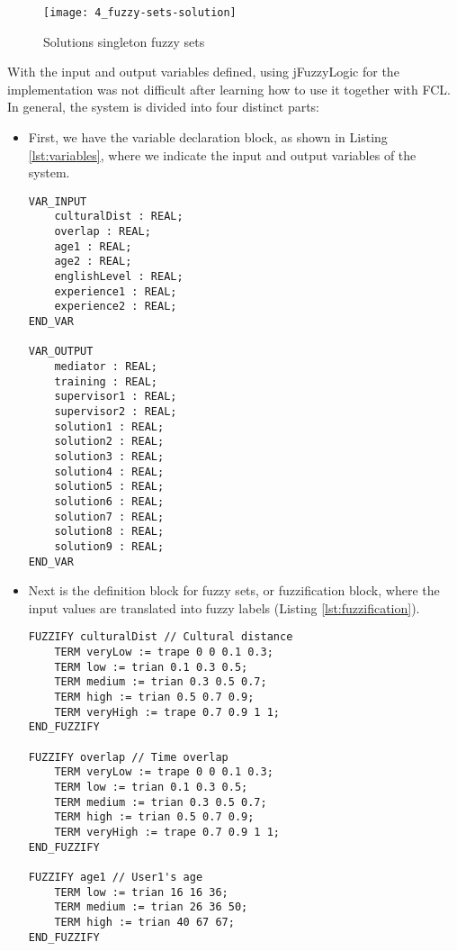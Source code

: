 	\begin{figure}
		\centering
		\texttt{[image: 4\_fuzzy-sets-solution]}
		\caption[Solutions singleton fuzzy sets]{Solutions singleton fuzzy sets}
		\label{fig:fs-solution}
	\end{figure}

With the input and output variables defined, using jFuzzyLogic for the implementation was not difficult after learning how to use it together with FCL. In general, the system is divided into four distinct parts:

\begin{itemize}
\item First, we have the variable declaration block, as shown in Listing \ref{lst:variables}, where we indicate the input and output variables of the system.

\begin{lstlisting}[caption={[Variables declaration]Variables declaration}, label=lst:variables]
VAR_INPUT
	culturalDist : REAL;
	overlap : REAL;
	age1 : REAL;
	age2 : REAL;
	englishLevel : REAL;
	experience1 : REAL;
	experience2 : REAL;
END_VAR

VAR_OUTPUT
	mediator : REAL;
	training : REAL;
	supervisor1 : REAL;
	supervisor2 : REAL;
	solution1 : REAL;
	solution2 : REAL;
	solution3 : REAL;
	solution4 : REAL;
	solution5 : REAL;
	solution6 : REAL;
	solution7 : REAL;
	solution8 : REAL;
	solution9 : REAL;
END_VAR
\end{lstlisting}

\item Next is the definition block for fuzzy sets, or fuzzification block, where the input values are translated into fuzzy labels (Listing \ref{lst:fuzzification}).

\begin{lstlisting}[caption={[Fuzzification block]Fuzzification block}, label=lst:fuzzification]
FUZZIFY culturalDist // Cultural distance
	TERM veryLow := trape 0 0 0.1 0.3;
	TERM low := trian 0.1 0.3 0.5;
	TERM medium := trian 0.3 0.5 0.7;
	TERM high := trian 0.5 0.7 0.9;
	TERM veryHigh := trape 0.7 0.9 1 1;
END_FUZZIFY

FUZZIFY overlap // Time overlap
	TERM veryLow := trape 0 0 0.1 0.3;
	TERM low := trian 0.1 0.3 0.5;
	TERM medium := trian 0.3 0.5 0.7;
	TERM high := trian 0.5 0.7 0.9;
	TERM veryHigh := trape 0.7 0.9 1 1;
END_FUZZIFY

FUZZIFY age1 // User1's age
	TERM low := trian 16 16 36;
	TERM medium := trian 26 36 50;
	TERM high := trian 40 67 67;
END_FUZZIFY


\end{lstlisting}
\end{itemize}

